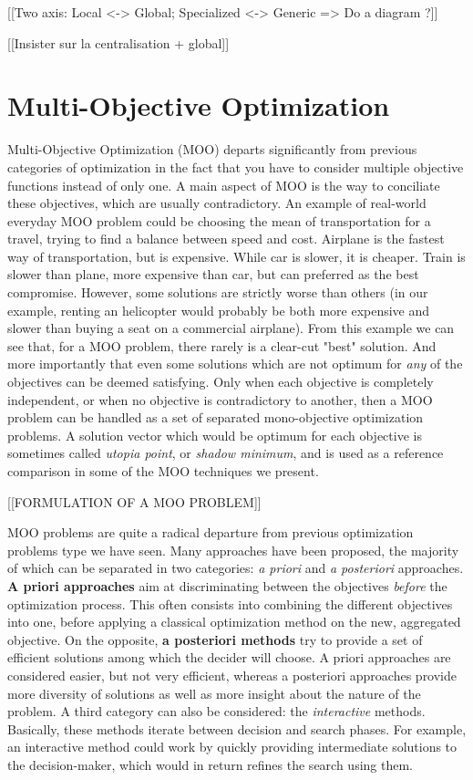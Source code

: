 [[Two axis: Local <-> Global; Specialized <-> Generic => Do a diagram ?]]

[[Insister sur la centralisation + global]]

\chapter{Multi-Objective Optimization}

Multi-Objective Optimization (MOO) departs significantly from previous categories of optimization in the fact that you have to consider multiple objective functions instead of only one. A main aspect of MOO is the way to conciliate these objectives, which are usually contradictory.
An example of real-world everyday MOO problem could be choosing the mean of transportation for a travel, trying to find a balance between speed and cost. Airplane is the fastest way of transportation, but is expensive. While car is slower, it is cheaper. Train is slower than plane, more expensive than car, but can preferred as the best compromise. However, some solutions are strictly worse than others (in our example, renting an helicopter would probably be both more expensive and slower than buying a seat on a commercial airplane).
From this example we can see that, for a MOO problem, there rarely is a clear-cut "best" solution. And more importantly that even some solutions which are not optimum for \emph{any} of the objectives can be deemed satisfying. Only when each objective is completely independent, or when no objective is contradictory to another, then a MOO problem can be handled as a set of separated mono-objective optimization problems.
A solution vector which would be optimum for each objective is sometimes called \emph{utopia point}, or \emph{shadow minimum}, and is used as a reference comparison in some of the MOO techniques we present.

[[FORMULATION OF A MOO PROBLEM]]

MOO problems are quite a radical departure from previous optimization problems type we have seen. Many approaches have been proposed, the majority of which can be separated in two categories: \emph{a priori} and \emph{a posteriori} approaches. \textbf{A priori approaches} aim at discriminating between the objectives \emph{before} the optimization process. This often consists into combining the different objectives into one, before applying a classical optimization method on the new, aggregated objective.
On the opposite, \textbf{a posteriori methods} try to provide a set of efficient solutions among which the decider will choose.
A priori approaches are considered easier, but not very efficient, whereas a posteriori approaches provide more diversity of solutions as well as more insight about the nature of the problem.
A third category can also be considered: the \emph{interactive} methods. Basically, these methods iterate between decision and search phases. For example, an interactive  method could work by quickly providing intermediate solutions to the decision-maker, which would in return refines the search using them.

